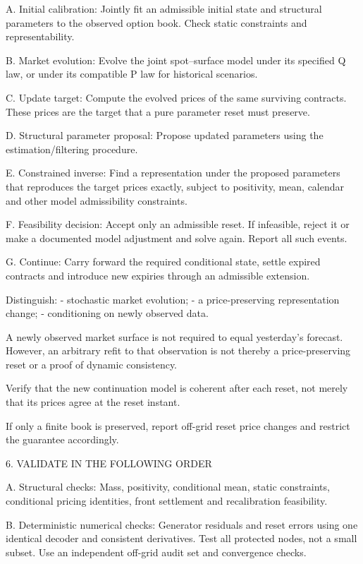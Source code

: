\documentclass[11pt,a4paper]{article}
\numberwithin{equation}{section}
\theoremstyle{definition}\newtheorem{definition}[theorem]{Definition}
\theoremstyle{remark}\newtheorem{remark}[theorem]{Remark}
\begin{document}
A. Initial calibration:
Jointly fit an admissible initial state and structural parameters to
the observed option book. Check static constraints and representability.

B. Market evolution:
Evolve the joint spot–surface model under its specified Q law, or under
its compatible P law for historical scenarios.

C. Update target:
Compute the evolved prices of the same surviving contracts. These
prices are the target that a pure parameter reset must preserve.

D. Structural parameter proposal:
Propose updated parameters using the estimation/filtering procedure.

E. Constrained inverse:
Find a representation under the proposed parameters that reproduces
the target prices exactly, subject to positivity, mean, calendar and
other model admissibility constraints.

F. Feasibility decision:
Accept only an admissible reset. If infeasible, reject it or make a
documented model adjustment and solve again. Report all such events.

G. Continue:
Carry forward the required conditional state, settle expired contracts
and introduce new expiries through an admissible extension.

Distinguish:
- stochastic market evolution;
- a price-preserving representation change;
- conditioning on newly observed data.

A newly observed market surface is not required to equal yesterday's
forecast. However, an arbitrary refit to that observation is not thereby
a price-preserving reset or a proof of dynamic consistency.

Verify that the new continuation model is coherent after each reset,
not merely that its prices agree at the reset instant.

If only a finite book is preserved, report off-grid reset price changes
and restrict the guarantee accordingly.

6. VALIDATE IN THE FOLLOWING ORDER

A. Structural checks:
Mass, positivity, conditional mean, static constraints, conditional
pricing identities, front settlement and recalibration feasibility.

B. Deterministic numerical checks:
Generator residuals and reset errors using one identical decoder and
consistent derivatives. Test all protected nodes, not a small subset.
Use an independent off-grid audit set and convergence checks.
\end{document}
